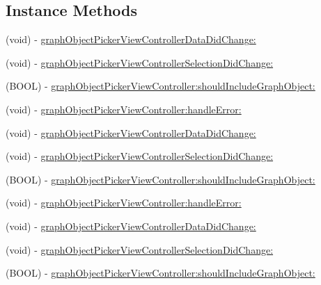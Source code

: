 \subsection*{Instance Methods}
\begin{DoxyCompactItemize}
\item 
(void) -\/ \hyperlink{protocolFBGraphObjectPickerDelegate_01-p_a7444276f3c20567235206a1be36074cb}{graph\+Object\+Picker\+View\+Controller\+Data\+Did\+Change\+:}
\item 
(void) -\/ \hyperlink{protocolFBGraphObjectPickerDelegate_01-p_a7c9da228bb329ef648df31794c7c7113}{graph\+Object\+Picker\+View\+Controller\+Selection\+Did\+Change\+:}
\item 
(B\+O\+OL) -\/ \hyperlink{protocolFBGraphObjectPickerDelegate_01-p_a52f34860c89cd1f02c6c4604bbf30629}{graph\+Object\+Picker\+View\+Controller\+:should\+Include\+Graph\+Object\+:}
\item 
(void) -\/ \hyperlink{protocolFBGraphObjectPickerDelegate_01-p_a99107978ecbc60a1a7daeeb2367d5cbf}{graph\+Object\+Picker\+View\+Controller\+:handle\+Error\+:}
\item 
(void) -\/ \hyperlink{protocolFBGraphObjectPickerDelegate_01-p_a7444276f3c20567235206a1be36074cb}{graph\+Object\+Picker\+View\+Controller\+Data\+Did\+Change\+:}
\item 
(void) -\/ \hyperlink{protocolFBGraphObjectPickerDelegate_01-p_a7c9da228bb329ef648df31794c7c7113}{graph\+Object\+Picker\+View\+Controller\+Selection\+Did\+Change\+:}
\item 
(B\+O\+OL) -\/ \hyperlink{protocolFBGraphObjectPickerDelegate_01-p_a52f34860c89cd1f02c6c4604bbf30629}{graph\+Object\+Picker\+View\+Controller\+:should\+Include\+Graph\+Object\+:}
\item 
(void) -\/ \hyperlink{protocolFBGraphObjectPickerDelegate_01-p_a99107978ecbc60a1a7daeeb2367d5cbf}{graph\+Object\+Picker\+View\+Controller\+:handle\+Error\+:}
\item 
(void) -\/ \hyperlink{protocolFBGraphObjectPickerDelegate_01-p_a7444276f3c20567235206a1be36074cb}{graph\+Object\+Picker\+View\+Controller\+Data\+Did\+Change\+:}
\item 
(void) -\/ \hyperlink{protocolFBGraphObjectPickerDelegate_01-p_a7c9da228bb329ef648df31794c7c7113}{graph\+Object\+Picker\+View\+Controller\+Selection\+Did\+Change\+:}
\item 
(B\+O\+OL) -\/ \hyperlink{protocolFBGraphObjectPickerDelegate_01-p_a52f34860c89cd1f02c6c4604bbf30629}{graph\+Object\+Picker\+View\+Controller\+:should\+Include\+Graph\+Object\+:}

\end{DoxyCompactItemize}
